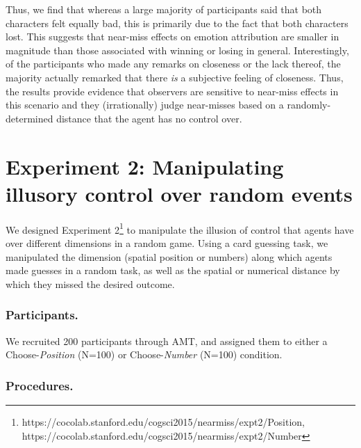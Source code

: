 \documentclass[10pt,letterpaper]{article}
\begin{document}
	Thus, we find that whereas a large majority of participants said that both characters felt equally bad, this is primarily due to the fact that both characters lost. This suggests that near-miss effects on emotion attribution are smaller in magnitude than those associated with winning or losing in general. Interestingly, of the participants who made any remarks on closeness or the lack thereof, the majority actually remarked that there \textit{is} a subjective feeling of closeness. Thus, the results provide evidence that observers are sensitive to near-miss effects in this scenario and they (irrationally) judge near-misses based on a randomly-determined distance that the agent has no control over.





\section{Experiment 2: Manipulating illusory control over random events}


We designed Experiment 2\footnote{https://cocolab.stanford.edu/cogsci2015/nearmiss/expt2/Position, https://cocolab.stanford.edu/cogsci2015/nearmiss/expt2/Number} to manipulate the illusion of control that agents have over different dimensions in a random game. Using a card guessing task, we manipulated the dimension (spatial position or numbers) along which agents made guesses in a random task, as well as the spatial or numerical distance by which they missed the desired outcome.  


\subsubsection{Participants.} We recruited 200 participants through AMT, and assigned them to either a Choose-\textit{Position} (N=100) or Choose-\textit{Number} (N=100) condition.



\subsubsection{Procedures.} 
\end{document}
